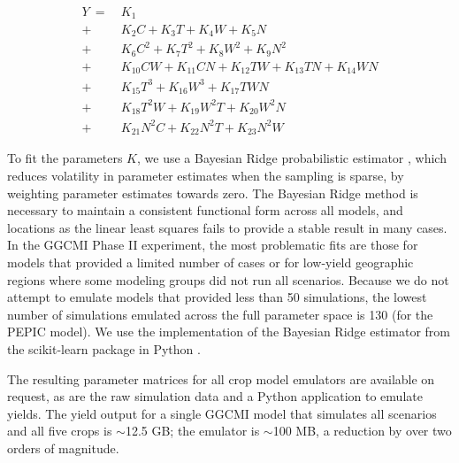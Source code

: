 \documentclass[preprint, 5p, times, twocolumn]{elsarticle}
\begin{document}
{\begin{align}
    \label{eqn:features_final}
    Y\ = \ & K_{1}  \\
       + \ & K_{2}  C     + K_{3}  T     + K_{4}  W     + K_{5}  N   \nonumber \\
       + \ & K_{6}  C^2   + K_{7}  T^2   + K_{8}  W^2   + K_{9}  N^2 \nonumber \\
       + \ & K_{10} C W   + K_{11} C N   + K_{12} T W   + K_{13} T N + K_{14} W N \nonumber \\ %
       + \ & K_{15} T^3   + K_{16} W^3   + K_{17} T W N  \nonumber \\ %
       + \ & K_{18} T^2 W + K_{19} W^2 T + K_{20} W^2 N  \nonumber \\ %
       + \ & K_{21} N^2 C + K_{22} N^2 T + K_{23} N^2 W  \nonumber    %
\end{align}

To fit the parameters $K$, we use a Bayesian Ridge probabilistic estimator \citep{MacKay91}, which reduces volatility in parameter estimates when the sampling is sparse, by weighting parameter estimates towards zero. The Bayesian Ridge method is necessary to maintain a consistent functional form across all models, and locations as the linear least squares fails to provide a stable result in many cases. In the GGCMI Phase II experiment, the most problematic fits are those for models that provided a limited number of cases or for low-yield geographic regions where some modeling groups did not run all scenarios. Because we do not attempt to emulate models that provided less than 50 simulations, the lowest number of simulations emulated across the full parameter space is 130 (for the PEPIC model). We use the implementation of the Bayesian Ridge estimator from the scikit-learn package in Python \citep{scikit-learn}. 

The resulting parameter matrices for all crop model emulators are available on request, as are the raw simulation data and a Python application to emulate yields. The yield output for a single GGCMI model that simulates all scenarios and all five crops is $\sim$12.5 GB; the emulator is $\sim$100 MB, a reduction by over two orders of magnitude. 

}
\end{document}
